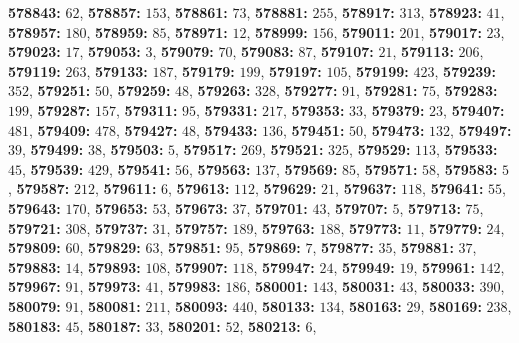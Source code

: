 \textsf{\bfseries 578843:} $62$, \textsf{\bfseries 578857:} $153$, \textsf{\bfseries 578861:} $73$, \textsf{\bfseries 578881:} $255$, \textsf{\bfseries 578917:} $313$, \textsf{\bfseries 578923:} $41$, \textsf{\bfseries 578957:} $180$, \textsf{\bfseries 578959:} $85$, \textsf{\bfseries 578971:} $12$, \textsf{\bfseries 578999:} $156$, \textsf{\bfseries 579011:} $201$, \textsf{\bfseries 579017:} $23$, \textsf{\bfseries 579023:} $17$, \textsf{\bfseries 579053:} $3$, \textsf{\bfseries 579079:} $70$, \textsf{\bfseries 579083:} $87$, \textsf{\bfseries 579107:} $21$, \textsf{\bfseries 579113:} $206$, \textsf{\bfseries 579119:} $263$, \textsf{\bfseries 579133:} $187$, \textsf{\bfseries 579179:} $199$, \textsf{\bfseries 579197:} $105$, \textsf{\bfseries 579199:} $423$, \textsf{\bfseries 579239:} $352$, \textsf{\bfseries 579251:} $50$, \textsf{\bfseries 579259:} $48$, \textsf{\bfseries 579263:} $328$, \textsf{\bfseries 579277:} $91$, \textsf{\bfseries 579281:} $75$, \textsf{\bfseries 579283:} $199$, \textsf{\bfseries 579287:} $157$, \textsf{\bfseries 579311:} $95$, \textsf{\bfseries 579331:} $217$, \textsf{\bfseries 579353:} $33$, \textsf{\bfseries 579379:} $23$, \textsf{\bfseries 579407:} $481$, \textsf{\bfseries 579409:} $478$, \textsf{\bfseries 579427:} $48$, \textsf{\bfseries 579433:} $136$, \textsf{\bfseries 579451:} $50$, \textsf{\bfseries 579473:} $132$, \textsf{\bfseries 579497:} $39$, \textsf{\bfseries 579499:} $38$, \textsf{\bfseries 579503:} $5$, \textsf{\bfseries 579517:} $269$, \textsf{\bfseries 579521:} $325$, \textsf{\bfseries 579529:} $113$, \textsf{\bfseries 579533:} $45$, \textsf{\bfseries 579539:} $429$, \textsf{\bfseries 579541:} $56$, \textsf{\bfseries 579563:} $137$, \textsf{\bfseries 579569:} $85$, \textsf{\bfseries 579571:} $58$, \textsf{\bfseries 579583:} $5$, \textsf{\bfseries 579587:} $212$, \textsf{\bfseries 579611:} $6$, \textsf{\bfseries 579613:} $112$, \textsf{\bfseries 579629:} $21$, \textsf{\bfseries 579637:} $118$, \textsf{\bfseries 579641:} $55$, \textsf{\bfseries 579643:} $170$, \textsf{\bfseries 579653:} $53$, \textsf{\bfseries 579673:} $37$, \textsf{\bfseries 579701:} $43$, \textsf{\bfseries 579707:} $5$, \textsf{\bfseries 579713:} $75$, \textsf{\bfseries 579721:} $308$, \textsf{\bfseries 579737:} $31$, \textsf{\bfseries 579757:} $189$, \textsf{\bfseries 579763:} $188$, \textsf{\bfseries 579773:} $11$, \textsf{\bfseries 579779:} $24$, \textsf{\bfseries 579809:} $60$, \textsf{\bfseries 579829:} $63$, \textsf{\bfseries 579851:} $95$, \textsf{\bfseries 579869:} $7$, \textsf{\bfseries 579877:} $35$, \textsf{\bfseries 579881:} $37$, \textsf{\bfseries 579883:} $14$, \textsf{\bfseries 579893:} $108$, \textsf{\bfseries 579907:} $118$, \textsf{\bfseries 579947:} $24$, \textsf{\bfseries 579949:} $19$, \textsf{\bfseries 579961:} $142$, \textsf{\bfseries 579967:} $91$, \textsf{\bfseries 579973:} $41$, \textsf{\bfseries 579983:} $186$, \textsf{\bfseries 580001:} $143$, \textsf{\bfseries 580031:} $43$, \textsf{\bfseries 580033:} $390$, \textsf{\bfseries 580079:} $91$, \textsf{\bfseries 580081:} $211$, \textsf{\bfseries 580093:} $440$, \textsf{\bfseries 580133:} $134$, \textsf{\bfseries 580163:} $29$, \textsf{\bfseries 580169:} $238$, \textsf{\bfseries 580183:} $45$, \textsf{\bfseries 580187:} $33$, \textsf{\bfseries 580201:} $52$, \textsf{\bfseries 580213:} $6$, 
